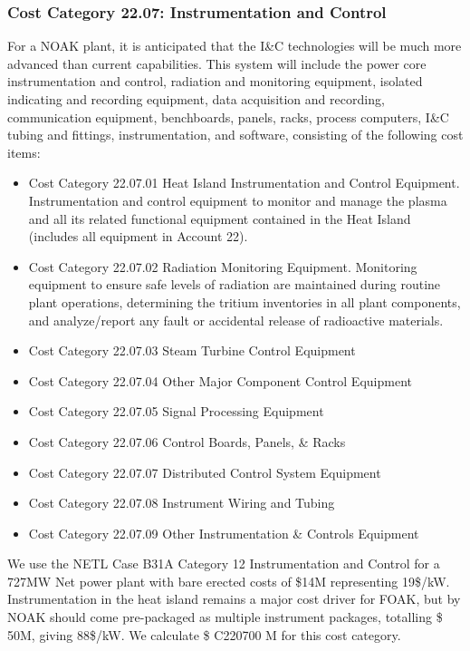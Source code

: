 
\subsubsection{Cost Category 22.07: Instrumentation and Control }

For a NOAK plant, it is anticipated that the I\&C technologies will be much more advanced than current  capabilities. This system will include the power core instrumentation and control, radiation and  monitoring equipment, isolated indicating and recording equipment, data acquisition and  recording, communication equipment, benchboards, panels, racks, process computers, I\&C tubing and fittings, instrumentation, and software, consisting of the following cost items:

\begin{itemize}
    \item Cost Category 22.07.01 Heat Island Instrumentation and Control Equipment. Instrumentation and control equipment to monitor and manage the plasma and all  its related functional equipment contained in the Heat Island (includes all equipment in Account 22).

    \item Cost Category 22.07.02 Radiation Monitoring Equipment. Monitoring equipment to ensure safe levels of radiation are maintained  during routine plant operations, determining the tritium inventories in all plant components, and  analyze/report any fault or accidental release of radioactive materials.

    \item Cost Category 22.07.03 Steam Turbine Control Equipment

    \item Cost Category 22.07.04 Other Major Component Control Equipment

    \item Cost Category 22.07.05 Signal Processing Equipment

    \item Cost Category 22.07.06 Control Boards, Panels, \& Racks
    \item Cost Category 22.07.07 Distributed Control System Equipment
    \item Cost Category 22.07.08 Instrument Wiring and Tubing
    \item Cost Category 22.07.09 Other Instrumentation \& Controls Equipment


\end{itemize}


We use the NETL Case B31A Category 12 Instrumentation and Control for a 727MW Net power plant with bare erected costs of \$14M representing 19\$/kW.  Instrumentation in the heat island remains a major cost driver for FOAK, but by NOAK should come pre-packaged as multiple instrument packages, totalling \$ 50M, giving 88\$/kW.   We calculate \$ C220700 M for this cost category.